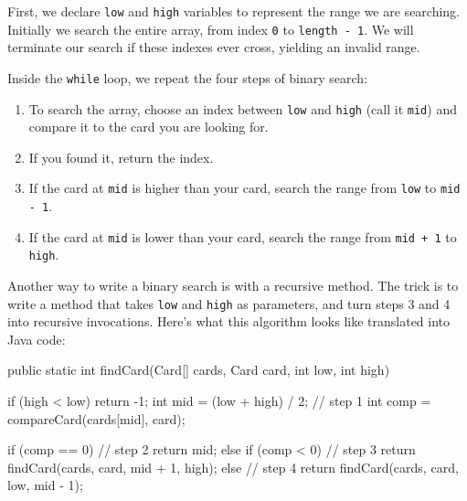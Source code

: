\documentclass[12pt]{book}
\makeatletter
\theoremstyle{exercise}
\newcommand{\java}[1]{\verb"#1"}
\renewcommand{\section}{\@startsection {section}{1}{\z@}%
    {-3.5ex \@plus -1ex \@minus -.2ex}%
    {0.7ex \@plus.2ex}%
    {\normalfont\Large\bfseries}}
\newcommand{\java}[1]{\lstinline{#1}} %
\makeatother
\begin{document}
First, we declare \java{low} and \java{high} variables to represent the range we are searching.
Initially we search the entire array, from index \java{0} to \java{length - 1}.
We will terminate our search if these indexes ever cross, yielding an invalid range.

Inside the \java{while} loop, we repeat the four steps of binary search:

\begin{enumerate}

\item To search the array, choose an index between \java{low} and \java{high} (call it \java{mid}) and compare it to the card you are looking for.

\item If you found it, return the index.

\item If the card at \java{mid} is higher than your card, search the range from \java{low} to \java{mid - 1}.

\item If the card at \java{mid} is lower than your card, search the range from \java{mid + 1} to \java{high}.

\end{enumerate}



Another way to write a binary search is with a recursive method.
The trick is to write a method that takes \java{low} and \java{high} as parameters, and turn steps 3 and 4 into recursive invocations.
Here's what this algorithm looks like translated into Java code:

\begin{code}
public static int findCard(Card[] cards, Card card,
                           int low, int high) {
    if (high < low) {
        return -1;
    }
    int mid = (low + high) / 2;                       // step 1
    int comp = compareCard(cards[mid], card);

    if (comp == 0) {                                  // step 2
        return mid;
    } else if (comp < 0) {                            // step 3
        return findCard(cards, card, mid + 1, high);
    } else {                                          // step 4
        return findCard(cards, card, low, mid - 1);
    }
}
\end{code}
\end{document}
